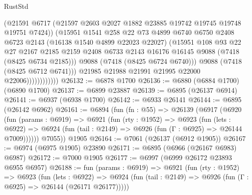 \begin{lexlean}{RustStd}
\begin{coremodule}
                              (@21591
                                @6717
                                (@21597 @2603 @2027 @1882 @23885 @19742 @19745 @19748 @19751 @7424))
                              (@15951
                                @1541
                                @258
                                @22
                                @73
                                @4899
                                @6740
                                @6750
                                @2408
                                @6723
                                @2143
                                (@16138 @1540 @4899 @22023 @22027)
                                (@15951
                                  @108
                                  @93
                                  @22
                                  @27
                                  @2167
                                  @2185
                                  @2159
                                  @2408
                                  @6733
                                  @2143
                                  @16176
                                  @16145
                                  @9088
                                  (@7418 (@8425 @6734 @2185)))
                                @9088
                                (@7418 (@8425 @6724 @6740)))
                              @9088
                              (@7418 (@8425 @6712 @6741)))
                            @21985
                            @21988
                            @21991
                            @21995
                            @22000
                            @22006))))))))))))
@26132 := @6878 @1700
@26136 := @6880 (@6884 @1700) (@6890 @1700)
@26137 := @6899 @23887
@26139 := @6895 (@26137 @6914)
@26141 := @6937 (@6938 @1700)
@26142 := @6933 @26141
@26144 := @6895 (@26142 @6962)
@26161 := @6894
    (fun (fn : @55) =>
    @26139
      (@6917
        (@6920
          (fun (params : @6919) =>
          @6921
            (fun (rty : @1952) =>
            @6923
              (fun (lets : @6922) =>
              @6924 (fun (tail : @2149) => @6926 (fun (Γ : @6925) => @26144 @7009))))))
        @7055))
    @1905
@26164 := @7061 (@26137 (@6912 @1905))
@26167 := @6974 (@6975 @1905) @23890
@26171 := @6895 (@6966 (@26167 @6983) @6987)
@26172 := @7000 @1905
@26177 := @6997 (@6999 @26172 @23893 @6955 @6957)
@26188 := fun (params : @6919) =>
  @6921
    (fun (rty : @1952) =>
    @6923
      (fun (lets : @6922) =>
      @6924 (fun (tail : @2149) => @6926 (fun (Γ : @6925) => @26144 (@26171 @26177)))))

\end{coremodule}
\end{lexlean}
